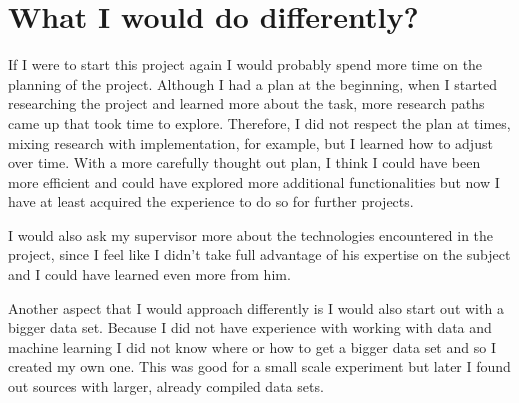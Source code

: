 \section{What I would do differently?}

If I were to start this project again I would probably spend more time on the planning of the project. Although I had a plan at the beginning, when I started researching the project and learned more about the task, more research paths came up that took time to explore. Therefore, I did not respect the plan at times, mixing research with implementation, for example, but I learned how to adjust over time. With a more carefully thought out plan, I think I could have been more efficient and could have explored more additional functionalities but now I have at least acquired the experience to do so for further projects. 

I would also ask my supervisor more about the technologies encountered in the project, since I feel like I didn't take full advantage of his expertise on the subject and I could have learned even more from him.

Another aspect that I would approach differently is I would also start out with a bigger data set. Because I did not have experience with working with data and machine learning I did not know where or how to get a bigger data set and so I created my own one. This was good for a small scale experiment but later I found out sources with larger, already compiled data sets.



